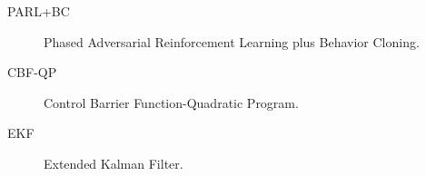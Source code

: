 \tableofcontents   %

\listoftables      %
\listoffigures     %


%
%















% 



%
\appendices



\begin{glossary}
\begin{description}
    \item[PARL+BC] Phased Adversarial Reinforcement Learning plus Behavior Cloning.
    \item[CBF-QP] Control Barrier Function-Quadratic Program.
    \item[EKF] Extended Kalman Filter.
\end{description}
\end{glossary}




